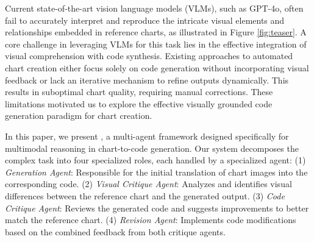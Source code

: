 Current state-of-the-art vision language models (VLMs), such as GPT-4o, often fail to accurately interpret and reproduce the intricate visual elements and relationships embedded in reference charts, as illustrated in Figure \ref{fig:teaser}. A core challenge in leveraging VLMs for this task lies in the effective integration of visual comprehension with code synthesis. Existing approaches to automated chart creation either focus solely on code generation without incorporating visual feedback or lack an iterative mechanism to refine outputs dynamically. This results in suboptimal chart quality, requiring manual corrections. These limitations motivated us to explore the effective visually grounded code generation paradigm for chart creation.


In this paper, we present \model{}, a multi-agent framework designed specifically for multimodal reasoning in chart-to-code generation. Our system decomposes the complex task into four specialized roles, each handled by a specialized agent: (1) \textit{Generation Agent}: Responsible for the initial translation of chart images into the corresponding code. (2) \textit{Visual Critique Agent}: Analyzes and identifies visual differences between the reference chart and the generated output. (3) \textit{Code Critique Agent}: Reviews the generated code and suggests improvements to better match the reference chart. (4)  \textit{Revision Agent}: Implements code modifications based on the combined feedback from both critique agents. 

